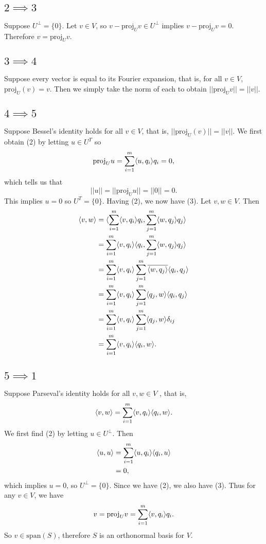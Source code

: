 \documentclass[12pt]{article}
\DeclarePairedDelimiter{\ang}{\langle}{\rangle}
\newcommand{\proj}{\text{proj}}
\begin{document}
\subsection*{$2\implies3$}

Suppose $U^\perp=\{0\}$. Let $v\in V$, so $v-\proj_Uv\in U^\perp$ implies $v-\proj_Uv=0$. Therefore $v=\proj_Uv$. 

\subsection*{$3\implies4$}
Suppose every vector is equal to its Fourier expansion, that is, for all $v \in V$, $\proj_U(v) = v$. Then we simply take the norm of each to obtain $||\proj_Uv||=||v||$.

\subsection*{$4\implies 5$}

Suppose Bessel’s identity holds for all $v \in V$, that is, $||\proj_U(v)|| = ||v||$. We first obtain (2) by letting $u\in U^T$ so
\[\proj_U u = \sum_{i=1}^m\ang{u,q_i}q_i = 0,\]
which tells us that
\[||u|| = ||\proj_U u|| = ||0|| = 0.\]
This implies $u=0$ so $U^T=\{0\}$. Having (2), we now have (3). Let $v,w\in V$. Then
\begin{align*}
    \ang{v,w}
        &= \ang{\sum_{i=1}^m\ang{v,q_i}q_i,\sum_{j=1}^m\ang{w,q_j}q_j} \\
        &= \sum_{i=1}^m\ang{v,q_i}\ang{q_i,\sum_{j=1}^m\ang{w,q_j}q_j} \\
        &= \sum_{i=1}^m\ang{v,q_i}\sum_{j=1}^m\overline{\ang{w,q_j}}\ang{q_i,q_j} \\
        &= \sum_{i=1}^m\ang{v,q_i}\sum_{j=1}^m\ang{q_j,w}\ang{q_i,q_j} \\
        &= \sum_{i=1}^m\ang{v,q_i}\sum_{j=1}^m\ang{q_j,w}\delta_{ij} \\
        &= \sum_{i=1}^m\ang{v,q_i}\ang{q_i,w}.
\end{align*}

\subsection*{$5\implies 1$}
Suppose Parseval’s identity holds for all $v, w \in V$ , that is,
\[\ang{v,w} = \sum_{i=1}^m\ang{v,q_i}\ang{q_i,w}.\]
We first find (2) by letting $u\in U^\perp$. Then
\begin{align*}
    \ang{u,u}
        &= \sum_{i=1}^m\ang{u,q_i}\ang{q_i,u} \\
        &= 0,
\end{align*}
which implies $u=0$, so $U^\perp=\{0\}$. Since we have (2), we also have (3). Thus for any $v\in V$, we have
\[v = \proj_Uv = \sum_{i=1}^m\ang{v,q_i}q_i.\]
So $v\in \text{span}(S)$, therefore $S$ is an orthonormal basis for $V$.
\end{document}
